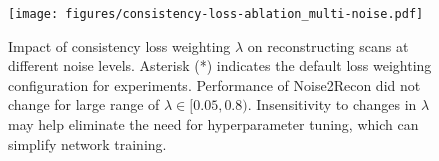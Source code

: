 \documentclass[10pt,twocolumn,letterpaper]{article}
\newcommand{\testnoise}{\sigma_{test}}
\begin{document}




\begin{figure}[t!]
  \centering
  \begin{center}
      \texttt{[image: figures/consistency-loss-ablation\_multi-noise.pdf]}
  \end{center}
  \caption{Impact of consistency loss weighting $\lambda$ on reconstructing scans at different noise levels. Asterisk (*) indicates the default loss weighting configuration for experiments. Performance of Noise2Recon did not change for large range of $\lambda \in [0.05, 0.8)$. Insensitivity to changes in $\lambda$ may help eliminate the need for hyperparameter tuning, which can simplify network training.}
  \label{fig:ablation-cons-loss-weighting}
\end{figure}
\end{document}

